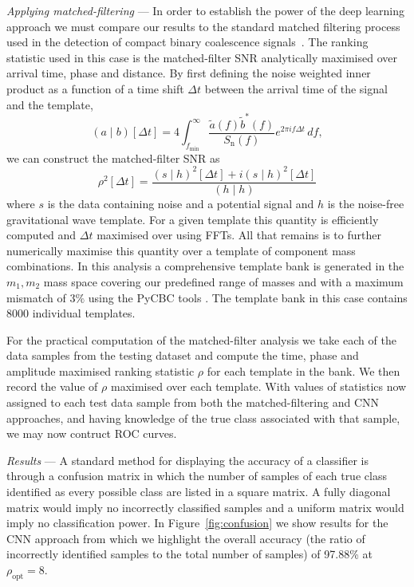 \documentclass[%
showpacs,
 amsmath,amssymb,
 aps,
 twocolumn,
 prl,
 reprint,
floatfix,
]{revtex4-1}
\newcommand{\cnnsnreight}{97.88}
\begin{document}
%
%
\textit{Applying matched-filtering} ---
%
%
In order to establish the power of the deep learning approach we must compare
our results to the standard matched filtering process used in the detection of
compact binary coalescence
signals~\cite{PhysRevD.85.122006,2013PhRvD..87b4033B}. The ranking statistic
used in this case is the matched-filter \ac{SNR} analytically maximised over
arrival time, phase and distance. By first defining the noise weighted inner
product as a function of a time shift $\Delta t$ between the arrival time of
the signal and the template,
%
%
\begin{equation}
(a\mid b)[\Delta t] =
4\int_{f_{\mathrm{min}}}^{\infty}\frac{\tilde{a}(f)\tilde{b}^{*}(f)}{S_{\mathrm{n}}(f)}e^{2\pi i
f\Delta t}\,df,
\end{equation}
%
we can construct the matched-filter \ac{SNR} as 
%
\begin{equation}
\rho^{2}[\Delta t]=\frac{(s\mid h)^{2}[\Delta t] + i(s\mid h)^{2}[\Delta t]}{(h\mid h)}
\end{equation}
%
where $s$ is the data containing noise and a potential signal and $h$ is the
noise-free gravitational wave template. For a given template this quantity is
efficiently computed and $\Delta t$ maximised over using \acp{FFT}.  All that
remains is to further numerically maximise this quantity over a template of
component mass combinations. In this analysis a comprehensive template bank is
generated in the $m_{1},m_{2}$ mass space covering our predefined range of
masses and with a maximum mismatch of $3\%$ using the PyCBC tools \cite{0264-9381-33-21-215004}
. The template bank in this case contains $8000$ individual templates. 

%
%
For the practical computation of the matched-filter analysis we take each of
the data samples from the testing dataset and compute the time, phase and
amplitude maximised ranking statistic $\rho$ for each template in the bank. We
then record the value of $\rho$ maximised over each template. With values of
statistics now assigned to each test data sample from both the
matched-filtering and \ac{CNN} approaches, and having knowledge of the
true class associated with that sample, we may now contruct \ac{ROC} curves.  

%
%
\textit{Results} --- 
%
%
A standard method for displaying the accuracy of a classifier is through a
confusion matrix in which the number of samples of each true class identified
as every possible class are listed in a square matrix. A fully diagonal matrix
would imply no incorrectly classified samples and a uniform matrix would imply
no classification power. In Figure~\ref{fig:confusion} we show results for the
\ac{CNN} approach from which we highlight the overall accuracy (the ratio of
incorrectly identified samples to the total number of samples) of
\cnnsnreight\% at $\rho_{\mathrm{opt}}=8$.
\end{document}

